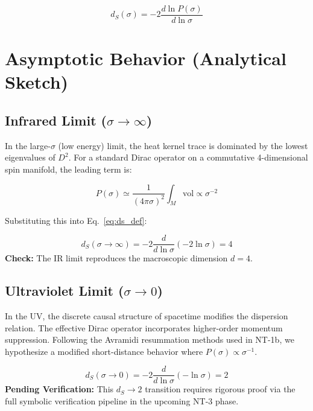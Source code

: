 \documentclass[11pt,a4paper]{article}
\begin{document}
\begin{equation}
  \boxed{ d_S(\sigma) = -2 \frac{d \ln P(\sigma)}{d \ln \sigma} }
  \label{eq:ds_def}
\end{equation}

\section{Asymptotic Behavior (Analytical Sketch)}

\subsection{Infrared Limit ($\sigma \to \infty$)}

In the large-$\sigma$ (low energy) limit, the heat kernel trace is dominated
by the lowest eigenvalues of $D^2$. For a standard Dirac operator on a
commutative 4-dimensional spin manifold, the leading term is:

\begin{equation}
  P(\sigma) \simeq \frac{1}{(4\pi\sigma)^2} \int_M \mathrm{vol} \propto \sigma^{-2}
\end{equation}

Substituting this into Eq.~\eqref{eq:ds_def}:

\begin{equation}
  d_S(\sigma \to \infty) = -2 \frac{d}{d\ln\sigma} (-2 \ln\sigma) = 4
\end{equation}
\textbf{Check:} The IR limit reproduces the macroscopic dimension $d=4$.

\subsection{Ultraviolet Limit ($\sigma \to 0$)}

In the UV, the discrete causal structure of spacetime modifies the
dispersion relation. The effective Dirac operator incorporates higher-order
momentum suppression. Following the Avramidi resummation methods used in NT-1b,
we hypothesize a modified short-distance behavior where $P(\sigma) \propto \sigma^{-1}$.

\begin{equation}
  d_S(\sigma \to 0) = -2 \frac{d}{d\ln\sigma} (-\ln\sigma) = 2
\end{equation}
\textbf{Pending Verification:} This $d_S \to 2$ transition requires rigorous
proof via the full symbolic verification pipeline in the upcoming NT-3 phase.
\end{document}
